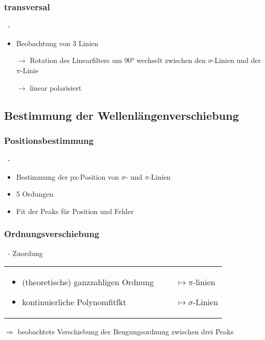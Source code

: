      \subsubsection{transversal}
       \begin{myframe}{\subsecname\ - \subsubsecname}
           \begin{itemize}
             \item Beobachtung von 3 Linien
             \item[$\rightarrow$] Rotation des Linearfilters um 90° wechselt zwischen den $\sigma$-Linien und der $\pi$-Linie
             \item[$\rightarrow$] linear polarisiert
           \end{itemize}
       \end{myframe}

  \subsection{Bestimmung der Wellenlängenverschiebung}
    \subsubsection{Positionsbestimmung}
      \begin{myframe}{\subsecname\ - \subsubsecname}
        \begin{itemize}
            \item Bestimmung der px-Position von $\sigma$- und $\pi$-Linien
            \item 5 Ordungen
            \item Fit der Peaks für Position und Fehler
        \end{itemize}
      \end{myframe}

    \subsubsection{Ordnungsverschiebung}
      \begin{myframe}{\subsecname\ - \subsubsecname}
        Zuordung
        \begin{tabular}{p{}p{}}
          \begin{itemize}
            \item (theoretische) ganzzahligen Ordnung
            \item kontinuierliche Polynomfitfkt
          \end{itemize} &
          \begin{itemize}
            \item[] $\mapsto \pi$-linien
            \item[] $\mapsto \sigma$-Linien
          \end{itemize} \\
        \end{tabular}
        $\Rightarrow$ beobachtete Verschiebung der Beugungsordnung zwischen drei Peaks
      \end{myframe}

